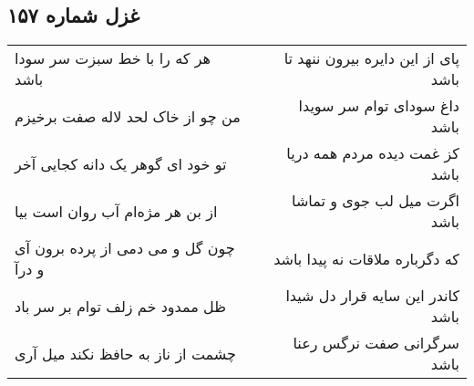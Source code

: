 \begin{center}
\section*{غزل شماره ۱۵۷}
\label{sec:sh157}
\begin{longtable}{l p{0.5cm} r}
هر که را با خط سبزت سر سودا باشد
&&
پای از این دایره بیرون ننهد تا باشد
\\
من چو از خاک لحد لاله صفت برخیزم
&&
داغ سودای توام سر سویدا باشد
\\
تو خود ای گوهر یک دانه کجایی آخر
&&
کز غمت دیده مردم همه دریا باشد
\\
از بن هر مژه‌ام آب روان است بیا
&&
اگرت میل لب جوی و تماشا باشد
\\
چون گل و می دمی از پرده برون آی و درآ
&&
که دگرباره ملاقات نه پیدا باشد
\\
ظل ممدود خم زلف توام بر سر باد
&&
کاندر این سایه قرار دل شیدا باشد
\\
چشمت از ناز به حافظ نکند میل آری
&&
سرگرانی صفت نرگس رعنا باشد
\\
\end{longtable}
\end{center}
